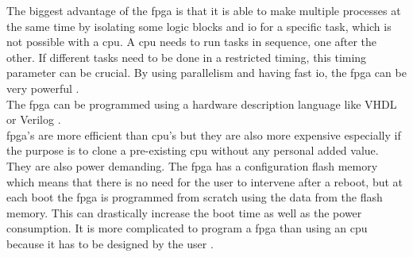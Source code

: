 The biggest advantage of the \gls{fpga} is that it is able to make multiple processes at the same time by isolating some logic blocks and \gls{io} for a specific task, which is not possible with a \gls{cpu}. A \gls{cpu} needs to run tasks in sequence, one after the other. If different tasks need to be done in a restricted timing, this timing parameter can be crucial. 
By using parallelism and having fast \gls{io}, the \gls{fpga} can be very powerful \citep {FPGA_youtube} \citep{FPGA_center} \citep{FPGA_toronto}. \\

The \gls{fpga} can be programmed using a hardware description language like VHDL or Verilog \citep {FPGA_youtube} \citep{FPGA_center} \citep{FPGA_toronto}. \\

\gls{fpga}'s are more efficient than \gls{cpu}'s but they are also more expensive especially if the purpose is to clone a pre-existing \gls{cpu} without any personal added value. They are also power demanding. The \gls{fpga} has a configuration flash memory which means that there is no need for the user to intervene after a reboot, but at each boot the \gls{fpga} is programmed from scratch using the data from the flash memory. This can drastically increase the boot time as well as the power consumption. It is more complicated to program a \gls{fpga} than using an \gls{cpu} because it has to be designed by the user \citep {FPGA_youtube} \citep{FPGA_center} \citep{FPGA_toronto}. \\








